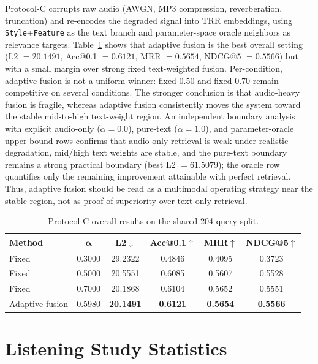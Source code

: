 \documentclass[journal,10pt]{IEEEtran}
\begin{document}
Protocol-C corrupts raw audio (AWGN, MP3 compression, reverberation, truncation) and re-encodes the degraded signal into TRR embeddings, using \texttt{Style}+\texttt{Feature} as the text branch and parameter-space oracle neighbors as relevance targets. Table~\ref{tab:protocolC_summary} shows that adaptive fusion is the best overall setting (L2 $=20.1491$, Acc@0.1 $=0.6121$, MRR $=0.5654$, NDCG@5 $=0.5566$) but with a small margin over strong fixed text-weighted fusion. Per-condition, adaptive fusion is not a uniform winner: fixed 0.50 and fixed 0.70 remain competitive on several conditions. The stronger conclusion is that audio-heavy fusion is fragile, whereas adaptive fusion consistently moves the system toward the stable mid-to-high text-weight region. An independent boundary analysis with explicit audio-only ($\alpha=0.0$), pure-text ($\alpha=1.0$), and parameter-oracle upper-bound rows confirms that audio-only retrieval is weak under realistic degradation, mid/high text weights are stable, and the pure-text boundary remains a strong practical boundary (best L2 $=61.5079$); the oracle row quantifies only the remaining improvement attainable with perfect retrieval. Thus, adaptive fusion should be read as a multimodal operating strategy near the stable region, not as proof of superiority over text-only retrieval.

\begin{table}[htbp]
\centering
\caption{Protocol-C overall results on the shared 204-query split.}
\label{tab:protocolC_summary}
\footnotesize
\setlength{\tabcolsep}{3.5pt}
\begin{tabular}{lccccc}
\toprule
\textbf{Method} & $\boldsymbol{\alpha}$ & \textbf{L2}$\downarrow$ & \textbf{Acc@0.1}$\uparrow$ & \textbf{MRR}$\uparrow$ & \textbf{NDCG@5}$\uparrow$ \\
\midrule
Fixed & 0.3000 & 29.2322 & 0.4846 & 0.4095 & 0.3723 \\
Fixed & 0.5000 & 20.5551 & 0.6085 & 0.5607 & 0.5528 \\
Fixed & 0.7000 & 20.1868 & 0.6104 & 0.5652 & 0.5551 \\
Adaptive fusion & 0.5980 & \textbf{20.1491} & \textbf{0.6121} & \textbf{0.5654} & \textbf{0.5566} \\
\bottomrule
\end{tabular}
\end{table}

\section{Listening Study Statistics}
\end{document}

